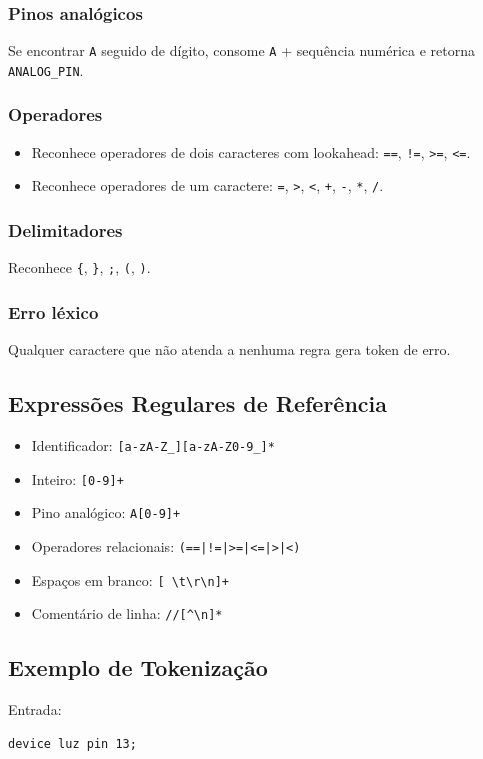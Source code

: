 \documentclass[12pt,a4paper]{article}
\begin{document}
\subsubsection{Pinos analógicos}
Se encontrar \texttt{A} seguido de dígito, consome \texttt{A} + sequência numérica e retorna \texttt{ANALOG\_PIN}.

\subsubsection{Operadores}
\begin{itemize}
  \item Reconhece operadores de dois caracteres com lookahead: \texttt{==}, \texttt{!=}, \texttt{>=}, \texttt{<=}.
  \item Reconhece operadores de um caractere: \texttt{=}, \texttt{>}, \texttt{<}, \texttt{+}, \texttt{-}, \texttt{*}, \texttt{/}.
\end{itemize}

\subsubsection{Delimitadores}
Reconhece \texttt{\{}, \texttt{\}}, \texttt{;}, \texttt{(}, \texttt{)}.

\subsubsection{Erro léxico}
Qualquer caractere que não atenda a nenhuma regra gera token de erro.

\subsection{Expressões Regulares de Referência}
\begin{itemize}
  \item Identificador: \texttt{[a-zA-Z\_][a-zA-Z0-9\_]*}
  \item Inteiro: \texttt{[0-9]+}
  \item Pino analógico: \texttt{A[0-9]+}
  \item Operadores relacionais: \texttt{(==|!=|>=|<=|>|<)}
  \item Espaços em branco: \texttt{[ \textbackslash t\textbackslash r\textbackslash n]+}
  \item Comentário de linha: \texttt{//[^\textbackslash n]*}
\end{itemize}

\subsection{Exemplo de Tokenização}
Entrada:
\begin{lstlisting}[style=homescript]
device luz pin 13;
\end{lstlisting}
\end{document}
